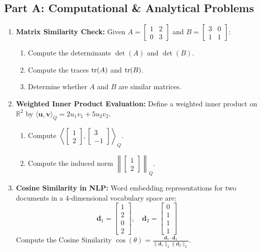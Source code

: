 \subsection*{Part A: Computational \& Analytical Problems}
\begin{enumerate}
\item \textbf{Matrix Similarity Check:} Given $A = \begin{bmatrix} 1 & 2 \\ 0 & 3 \end{bmatrix}$ and $B = \begin{bmatrix} 3 & 0 \\ 1 & 1 \end{bmatrix}$:
\begin{enumerate}
    \item Compute the determinants $\det(A)$ and $\det(B)$.
    \item Compute the traces $\operatorname{tr}(A)$ and $\operatorname{tr}(B)$.
    \item Determine whether $A$ and $B$ are similar matrices.
\end{enumerate}

\item \textbf{Weighted Inner Product Evaluation:} Define a weighted inner product on $\mathbb{R}^2$ by $\langle \mathbf{u}, \mathbf{v} \rangle_Q = 2 u_1 v_1 + 5 u_2 v_2$.
\begin{enumerate}
    \item Compute $\left\langle \begin{bmatrix} 1 \\ 2 \end{bmatrix}, \begin{bmatrix} 3 \\ -1 \end{bmatrix} \right\rangle_Q$.
    \item Compute the induced norm $\left\| \begin{bmatrix} 1 \\ 2 \end{bmatrix} \right\|_Q$.
\end{enumerate}

\item \textbf{Cosine Similarity in NLP:} Word embedding representations for two documents in a 4-dimensional vocabulary space are:
\begin{equation*}
\mathbf{d}_1 = \begin{bmatrix} 1 \\ 2 \\ 0 \\ 2 \end{bmatrix}, \quad \mathbf{d}_2 = \begin{bmatrix} 0 \\ 1 \\ 1 \\ 1 \end{bmatrix}
\end{equation*}
Compute the Cosine Similarity $\cos(\theta) = \frac{\mathbf{d}_1 \cdot \mathbf{d}_2}{\|\mathbf{d}_1\|_2 \|\mathbf{d}_2\|_2}$.


\end{enumerate}
